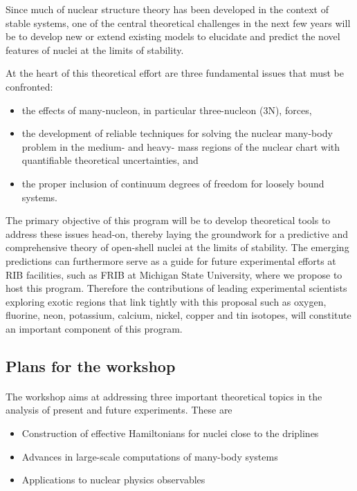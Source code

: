 \documentclass[%
twoside,                 %
final,                   %
10pt]{article}
\begin{document}
Since much of nuclear structure theory has been developed in the
context of stable systems, one of the central theoretical challenges
in the next few years will be to develop new or extend existing models
to elucidate and predict the novel features of nuclei at the limits of
stability.  

At the heart of this theoretical effort are three fundamental issues that must be confronted:
\begin{itemize}
\item the effects of many-nucleon, in particular three-nucleon (3N), forces, 

\item the development of reliable techniques for solving the nuclear many-body problem in the medium- and heavy- mass regions of the nuclear chart with quantifiable theoretical uncertainties, and 

\item the proper inclusion of continuum degrees of freedom for loosely bound systems. 
\end{itemize}

\noindent
The primary objective of this program will be to develop theoretical tools to  address these issues head-on, thereby laying the groundwork for a predictive and comprehensive theory of open-shell nuclei at the limits of stability.  The emerging predictions can furthermore serve as a guide for future experimental efforts at RIB facilities, such as FRIB at Michigan State University, where we propose to host this program.  Therefore the contributions of leading experimental scientists exploring exotic regions that link tightly with this proposal such as oxygen, fluorine, neon, potassium, calcium, nickel, copper and tin isotopes, will constitute an important component of this program.





\subsection{Plans for the workshop}

\paragraph{}
The workshop aims at addressing three important theoretical topics in the analysis
of present and future experiments.  These are
\begin{itemize}
\item Construction of effective Hamiltonians for nuclei close to the driplines

\item Advances in large-scale computations of many-body systems

\item Applications to nuclear physics observables
\end{itemize}
\end{document}
